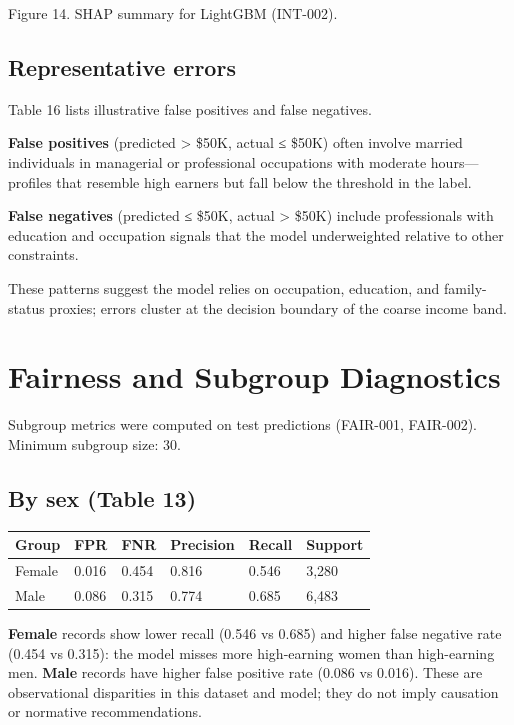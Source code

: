 ﻿\documentclass[11pt,a4paper]{article}
\begin{document}
Figure 14. SHAP summary for LightGBM (INT-002).

\subsection{Representative errors}

Table 16 lists illustrative false positives and false negatives.

\textbf{False positives} (predicted > \$50K, actual ≤ \$50K) often involve married individuals in managerial or professional occupations with moderate hours—profiles that resemble high earners but fall below the threshold in the label.

\textbf{False negatives} (predicted ≤ \$50K, actual > \$50K) include professionals with education and occupation signals that the model underweighted relative to other constraints.

These patterns suggest the model relies on occupation, education, and family-status proxies; errors cluster at the decision boundary of the coarse income band.


\section{Fairness and Subgroup Diagnostics}

Subgroup metrics were computed on test predictions (FAIR-001, FAIR-002). Minimum subgroup size: 30.

\subsection{By sex (Table 13)}

\begin{table}[H]
  \centering
  \small
  \begin{tabular}{llllll}
    \toprule
    Group & FPR & FNR & Precision & Recall & Support \\
    \midrule
    Female & 0.016 & 0.454 & 0.816 & 0.546 & 3,280 \\
    Male & 0.086 & 0.315 & 0.774 & 0.685 & 6,483 \\
    \bottomrule
  \end{tabular}
\end{table}

\textbf{Female} records show lower recall (0.546 vs 0.685) and higher false negative rate (0.454 vs 0.315): the model misses more high-earning women than high-earning men. \textbf{Male} records have higher false positive rate (0.086 vs 0.016). These are observational disparities in this dataset and model; they do not imply causation or normative recommendations.
\end{document}
